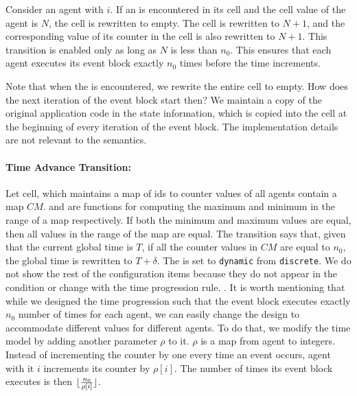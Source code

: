  Consider an agent with  $i$. If an  is encountered in its  cell and the  cell value of the agent is $N$, the  cell is rewritten to empty. The  cell is rewritten to $N+1$, and the corresponding value of its counter in the  cell is also rewritten to $N+1$. This transition is enabled only as long as $N$ is less than $n_0$. This ensures that each agent executes its event block exactly $n_0$ times before the time increments. 
\vspace{-1mm}

Note that when the  is encountered, we rewrite the entire  cell to empty. How does the next iteration of the event block start then? We maintain a copy of the original application code in the state information, which is copied into the  cell at the beginning of every iteration of the event block. The implementation details are not relevant to the semantics. 

\paragraph{Time Advance Transition:}

	Let  cell, which maintains a map of ids to counter values of all agents contain a map $CM$.  and  are functions for computing the maximum and minimum in the range of a map respectively. If both the minimum and maximum values are equal, then all values in the range of the map are equal.  The  transition says that, given that the current global time is $T$, if all the counter values in $CM$ are equal to $n_0$, the global time is rewritten to $T+\delta$. The  is set to \verb|dynamic| from \verb|discrete|. We do not show the rest of the configuration items because they do not appear in the condition or change with the time progression rule. 
. 
It is worth mentioning that while we designed the time progression such that the event block executes exactly $n_0$ number of times for each agent, we can easily change the design to accommodate different values for different agents. To do that, we modify the time model by adding another parameter $\rho$ to it. $\rho$ is a map from agent  to integers. Instead of incrementing the counter by one every time an event occurs, agent with it $i$ increments its counter by $\rho[i]$. The number of times its event block executes is then $\lfloor\frac{n_0}{\rho[i]}\rfloor$.



